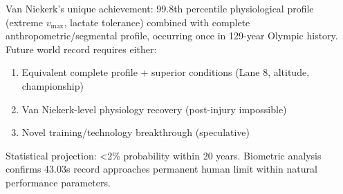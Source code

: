 Van Niekerk's unique achievement: 99.8th percentile physiological profile (extreme $v_{\max}$, lactate tolerance) combined with complete anthropometric/segmental profile, occurring once in 129-year Olympic history. Future world record requires either:
\begin{enumerate}
    \item Equivalent complete profile + superior conditions (Lane 8, altitude, championship)
    \item Van Niekerk-level physiology recovery (post-injury impossible)
    \item Novel training/technology breakthrough (speculative)
\end{enumerate}

Statistical projection: <2\% probability within 20 years. Biometric analysis confirms 43.03s record approaches permanent human limit within natural performance parameters.
